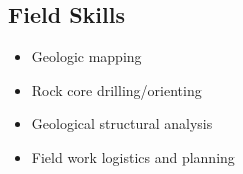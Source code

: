\documentclass[10pt,a4paper,sans]{moderncv}
\begin{document}
\subsection{Field Skills}

\begin{itemize}
 \item Geologic mapping
 \item Rock core drilling/orienting
 \item Geological structural analysis
 \item Field work logistics and planning
\end{itemize}


\end{document}
